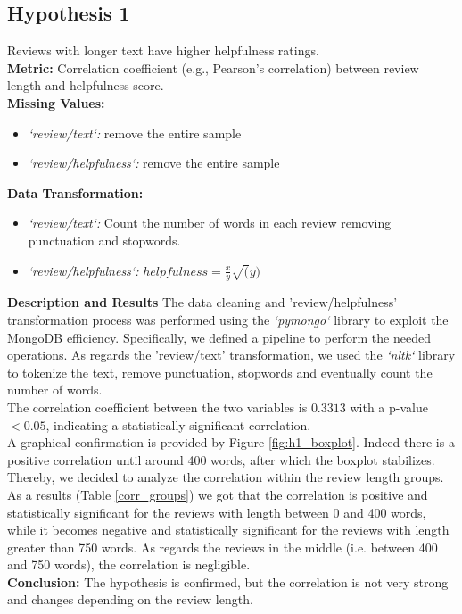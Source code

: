 \subsection*{Hypothesis 1}

Reviews with longer text have higher helpfulness ratings.\\
\noindent
\textbf{Metric:} Correlation coefficient (e.g., Pearson's correlation) between review length and helpfulness score.\\
\noindent
\textbf{Missing Values:}
\begin{itemize}
    \item \textit{`review/text`:} remove the entire sample
    \item \textit{`review/helpfulness`:} remove the entire sample
\end{itemize}
\noindent
\textbf{Data Transformation:}
\begin{itemize}
    \item \textit{`review/text`:} Count the number of words in each review removing punctuation and stopwords.
    \item \textit{`review/helpfulness`:} $helpfulness = \frac{x}{y} \sqrt(y)$
\end{itemize}\vspace{0.5cm}
\noindent
\textbf{Description and Results}
The data cleaning and 'review/helpfulness' transformation process was performed using the \textit{`pymongo`} library to exploit the 
MongoDB efficiency. Specifically, we defined a pipeline to perform the needed operations. As regards the 
'review/text' transformation, we used the \textit{`nltk`} library to tokenize the text, remove punctuation, stopwords and eventually
count the number of words.\\
The correlation coefficient between the two variables is $0.3313$ with a p-value $<0.05$, indicating a statistically significant correlation.\\
A graphical confirmation is provided by Figure \ref{fig:h1_boxplot}. Indeed there is a positive correlation until around 400 words, after which the
boxplot stabilizes. Thereby, we decided to analyze the correlation within the review length groups. As a results (Table \ref{corr_groups}) we got that the correlation is
positive and statistically significant for the reviews with length between 0 and 400 words, while it becomes negative and statistically significant
for the reviews with length greater than 750 words. As regards the reviews in the middle (i.e. between 400 and 750 words), the correlation is negligible.\\
\textbf{Conclusion:} The hypothesis is confirmed, but the correlation is not very strong and changes depending on the review length.\\

